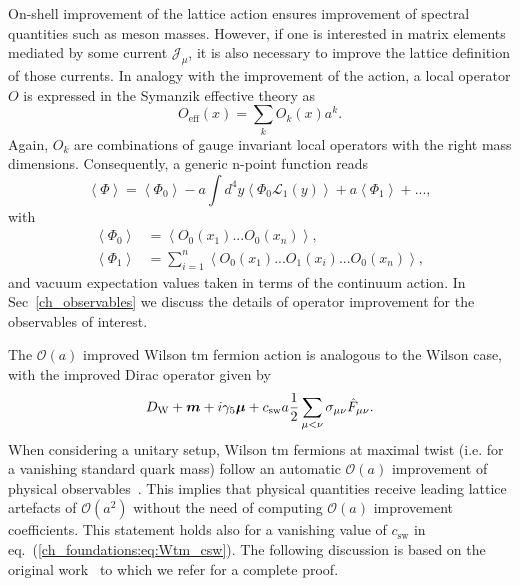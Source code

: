 On-shell improvement of the lattice action ensures improvement of spectral quantities such as meson masses. However, if one is interested in matrix elements mediated by some current $\mathcal{J}_{\mu}$, it is also necessary to improve the lattice definition of those currents. In analogy with the improvement of the action, a local operator $O$ is expressed in the Symanzik effective theory as
\begin{equation}
O_{\textrm{eff}}(x)=\sum_kO_k(x)a^k.
\end{equation}
Again, $O_k$ are combinations of gauge invariant local operators with the right mass dimensions. Consequently, a generic n-point function reads
\begin{equation}
\label{ch_foundation:eq:Oimpr}
\left<\Phi\right>=\left<\Phi_0\right>-a\int d^4y\left<\Phi_0\mathcal{L}_1(y)\right>+a\left<\Phi_1\right>+...,
\end{equation}
with 
\begin{align}
\left<\Phi_0\right>&=\left<O_0(x_1)...O_0(x_n)\right>, \\
\left<\Phi_1\right>&=\sum_{i=1}^n\left<O_0(x_1)...O_1(x_i)...O_0(x_n)\right>,
\end{align}
and vacuum expectation values taken in terms of the continuum action. In Sec~\ref{ch_observables} we discuss the details of operator improvement for the observables of interest.

The $\mathcal{O}(a)$ improved Wilson tm fermion action is analogous to the Wilson case, with the improved Dirac operator given by 
\begin{equation}
\label{ch_foundations:eq:Wtm_csw}
D_{\textrm W}+\boldsymbol{m}+i\gamma_5\boldsymbol{\mu}+c_{\textrm{sw}}a\frac{1}{2}\sum_{\mu<\nu}\sigma_{\mu\nu}\hat{F}_{\mu\nu}.
\end{equation}
When considering a unitary setup,  Wilson tm fermions 
at maximal twist (i.e. for a vanishing standard quark mass) follow
an automatic $\mathcal{O}(a)$ improvement of physical observables~\citep{Frezzotti:2003ni,Shindler:2007vp}. This implies  that physical quantities receive leading lattice artefacts of $\mathcal{O}(a^2)$ 
 without the need of computing $\mathcal{O}(a)$ improvement coefficients. This statement holds also for a vanishing value of $c_{\textrm{sw}}$ in eq.~(\ref{ch_foundations:eq:Wtm_csw}). The following discussion is based on the original work~\citep{Frezzotti:2003ni} to which we refer for a complete proof.

